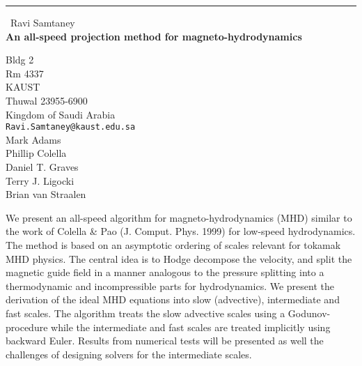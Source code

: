 \documentclass{report}
\begin{document}
\begin{center}
\rule{6in}{1pt} \
{\large Ravi Samtaney \\
{\bf An all-speed projection method for magneto-hydrodynamics}}

Bldg 2 \\ Rm 4337 \\ KAUST \\ Thuwal 23955-6900 \\ Kingdom of Saudi Arabia
\\
{\tt Ravi.Samtaney@kaust.edu.sa}\\
Mark Adams\\
Phillip Colella\\
Daniel T. Graves\\
Terry J. Ligocki\\
Brian van Straalen\end{center}

We present an all-speed algorithm for magneto-hydrodynamics (MHD) similar
to the work of Colella & Pao (J. Comput. Phys. 1999) for low-speed
hydrodynamics. The method is based on an asymptotic ordering of scales
relevant for tokamak MHD physics. The central idea is to Hodge decompose
the velocity, and split the magnetic guide field in a manner analogous to
the pressure splitting into a thermodynamic and incompressible parts for
hydrodynamics. We present the derivation of the ideal MHD equations into
slow (advective), intermediate and fast scales. The algorithm treats the
slow advective scales using a Godunov-procedure while the intermediate
and fast scales are treated implicitly using backward Euler. Results from
numerical tests will be presented as well the challenges of designing
solvers for the intermediate scales.
\end{document}

